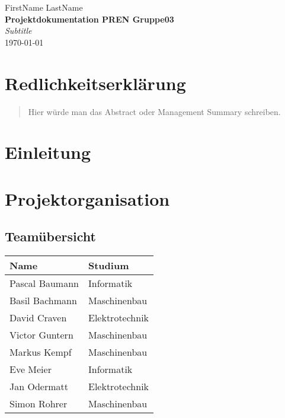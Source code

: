 \documentclass[a4paper]{report}
\newcommand*{\titleAP}{\begingroup %
	\centering
	\vspace*{\baselineskip} %
	
	{\Large FirstName LastName}\\[0.167\textheight] %
	
	{\Huge\bfseries Projektdokumentation PREN Gruppe03}\\[\baselineskip]
	
	{\Large \textit{Subtitle}}\\
	\today
	
	\vspace*{3\baselineskip} %
	\endgroup}
\begin{document}
\titleAP

\newpage

\chapter*{Redlichkeitserklärung}

\newpage

\begin{abstract}
	Hier würde man das Abstract oder Management Summary schreiben.
\end{abstract}

\tableofcontents

\newpage

\chapter{Einleitung}
\label{ch:Intro}

\chapter{Projektorganisation}

\section{Teamübersicht}

\begin{tabular}{|l|l|}
	\hline 
	\textbf{Name} & \textbf{Studium} \\ 
	\hline 
	Pascal Baumann & Informatik \\ 
	\hline 
	Basil Bachmann & Maschinenbau \\ 
	\hline 
	David Craven & Elektrotechnik \\ 
	\hline 
	Victor Guntern & Maschinenbau \\ 
	\hline
	Markus Kempf & Maschinenbau \\ 
	\hline  
	Eve Meier & Informatik \\ 
	\hline 
	Jan Odermatt & Elektrotechnik \\
	\hline
	Simon Rohrer & Maschinenbau \\
	\hline
\end{tabular} 
\end{document}
